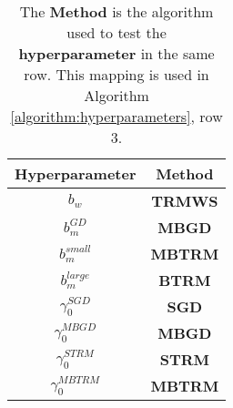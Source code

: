 \documentclass[letterpaper,12pt,titlepage,oneside,final]{book}
\begin{document}
	\begin{table}[h]
		\centering
		\begin{tabular}{ |c|c| }  
			\hline
			\textbf{Hyperparameter} & \textbf{Method}\\
			\hline
			$b_{w}$ & \textbf{TRMWS} \\
			\hline
			$b_{m}^{GD}$ & \textbf{MBGD} \\
			\hline
			$b_{m}^{small}$ & \textbf{MBTRM} \\
			\hline
			$b_{m}^{large}$ & \textbf{BTRM} \\
			\hline
			$\gamma^{SGD}_{0}$ & \textbf{SGD} \\ 
			\hline
			$\gamma^{MBGD}_{0}$ & \textbf{MBGD} \\ 
			\hline
			$\gamma^{STRM}_{0}$ & \textbf{STRM} \\ 
			\hline
			$\gamma^{MBTRM}_{0}$ & \textbf{MBTRM} \\ 
			\hline
		\end{tabular}
		\caption{ The \textbf{Method} is the  algorithm used to test the \textbf{hyperparameter} in the same row. This mapping is used in Algorithm \ref{algorithm:hyperparameters}, row 3.}
		\label{table:hyperparameters}
	\end{table}
\end{document}
